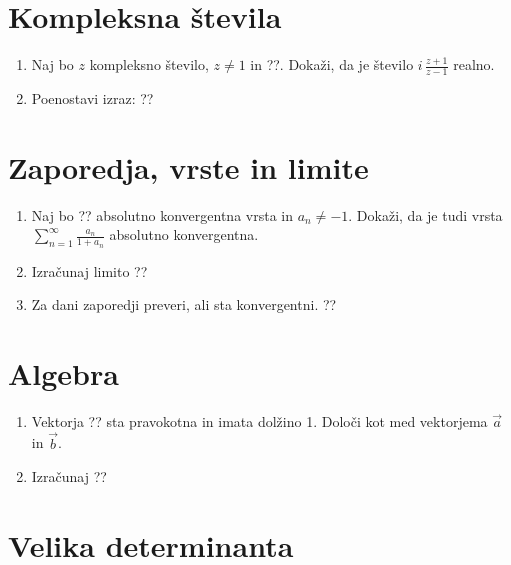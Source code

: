 \documentclass[a4paper,12pt]{article}
\begin{document}
\section*{Kompleksna števila}

\begin{enumerate}
\item
Naj bo \(z\) kompleksno število, \(z \ne 1\) in ??.
Dokaži, da je število \( i \, \frac{z+1}{z-1} \) realno.

\item
Poenostavi izraz:
??
\end{enumerate}

\section*{Zaporedja, vrste in limite}

\begin{enumerate}
\item
Naj bo ?? absolutno konvergentna vrsta in \(a_n \ne -1\).
Dokaži, da je tudi vrsta \(\sum_{n=1}^\infty \frac{a_n}{1+a_n}\)
absolutno konvergentna.

\item
Izračunaj limito
??

\item
Za dani zaporedji preveri, ali sta konvergentni.
??
\end{enumerate}

\section*{Algebra}

\begin{enumerate}
\item
Vektorja ??
sta pravokotna in imata dolžino 1. Določi kot med vektorjema \(\vec{a}\) in \(\vec{b}\).

\item
Izračunaj
??
\end{enumerate}

\section*{Velika determinanta}
\end{document}
